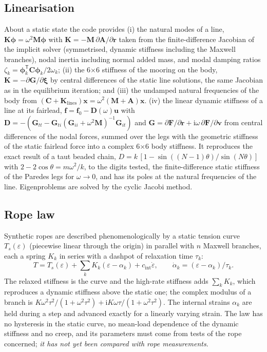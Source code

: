 \documentclass[11pt,a4paper]{article}
\newcommand{\vect}[1]{\boldsymbol{#1}}
\begin{document}
\subsection{Linearisation}
About a static state the code provides (i) the natural modes of a line, $\mathbf K\vect\phi=\omega^2\mathbf M\vect\phi$ with $\mathbf K=-\mathbf M\,\partial\mathbf A/\partial\vect r$ taken from the finite-difference Jacobian of the implicit solver (symmetrised, dynamic stiffness including the Maxwell branches), nodal inertia including normal added mass, and modal damping ratios $\zeta_k=\vect\phi_k^{\mathsf T}\mathbf C\vect\phi_k/2\omega_k$; (ii) the 6$\times$6 stiffness of the mooring on the body, $\mathbf K=-\partial\vect G/\partial\vect\xi$ by central differences of the static line solutions, the same Jacobian as in the equilibrium iteration; and (iii) the undamped natural frequencies of the body from $(\mathbf C+\mathbf K_{\mathrm{lines}})\vect x=\omega^2(\mathbf M+\mathbf A)\vect x$. (iv) the linear dynamic stiffness of a line at its fairlead, $\mathbf f=\mathbf f_0-\mathbf D(\omega)\mathbf u$ with $\mathbf D=-(\mathbf G_{tt}-\mathbf G_{ti}(\mathbf G_{ii}+\omega^2\mathbf M)^{-1}\mathbf G_{it})$ and $\mathbf G=\partial\mathbf F/\partial\vect r+\mathrm i\omega\,\partial\mathbf F/\partial\vect v$ from central differences of the nodal forces, summed over the legs with the geometric stiffness of the static fairlead force into a complex 6$\times$6 body stiffness. It reproduces the exact result of a taut beaded chain, $D=k\,[1-\sin((N-1)\theta)/\sin(N\theta)]$ with $2-2\cos\theta=m\omega^2/k$, to the digits tested, the finite-difference static stiffness of the Paredes legs for $\omega\to0$, and has its poles at the natural frequencies of the line. Eigenproblems are solved by the cyclic Jacobi method.

\subsection{Rope law}
Synthetic ropes are described phenomenologically by a static tension curve $T_s(\varepsilon)$ (piecewise linear through the origin) in parallel with $n$ Maxwell branches, each a spring $K_k$ in series with a dashpot of relaxation time $\tau_k$:
\begin{equation}
T=T_s(\varepsilon)+\sum_k K_k(\varepsilon-\alpha_k)+c_{\mathrm{int}}\dot\varepsilon,\qquad \dot\alpha_k=(\varepsilon-\alpha_k)/\tau_k .
\end{equation}
The relaxed stiffness is the curve and the high-rate stiffness adds $\sum_kK_k$, which reproduces a dynamic stiffness above the static one; the complex modulus of a branch is $K\omega^2\tau^2/(1+\omega^2\tau^2)+\mathrm{i}K\omega\tau/(1+\omega^2\tau^2)$. The internal strains $\alpha_k$ are held during a step and advanced exactly for a linearly varying strain. The law has no hysteresis in the static curve, no mean-load dependence of the dynamic stiffness and no creep, and its parameters must come from tests of the rope concerned; \emph{it has not yet been compared with rope measurements}.
\end{document}
